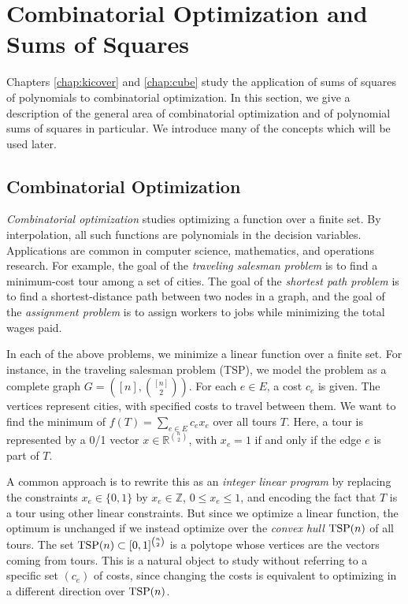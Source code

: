 \section{Combinatorial Optimization and Sums of Squares}
\label{section:cosos}
Chapters \ref{chap:kicover} and \ref{chap:cube} study the application of sums of squares of polynomials to combinatorial optimization. 
In this section, we give a description of the general area of combinatorial optimization and of polynomial sums of squares in particular.
We introduce many of the concepts which will be used later.

\subsection{Combinatorial Optimization}
\label{section:copt}
{\em Combinatorial optimization} studies optimizing a function over a finite set. 
By interpolation, all such functions are polynomials in the decision variables.
Applications are common in computer science, mathematics, and operations research.
For example, the goal of the {\em traveling salesman problem} is to find a minimum-cost tour among a set of cities.
The goal of the {\em shortest path problem} is to find a shortest-distance path between two nodes in a graph, and the goal of the {\em assignment problem} is to assign workers to jobs while minimizing the total wages paid. 

In each of the above problems, we minimize a linear function over a finite set.
For instance, in the traveling salesman problem (TSP), we model the problem as a complete graph $G=([n],{ {[n]} \choose 2})$.
For each $e \in E$, a cost $c_e$ is given.
The vertices represent cities, with specified costs to travel between them.
We want to find the minimum of $f(T) = \sum_{e \in E} c_ex_e$ over all tours $T$.
Here, a tour is represented by a 0/1 vector $x \in \mathbb{R}^{n \choose 2}$, with $x_e = 1$ if and only if the edge $e$ is part of $T$.

A common approach is to rewrite this as an {\em integer linear program} by replacing the constraints $x_e \in \{0,1\}$ by $x_e \in \mathbb{Z}$, $0 \le x_e \le 1$, and encoding the fact that $T$ is a tour using other linear constraints.
But since we optimize a linear function, the optimum is unchanged if we instead optimize over the {\em convex hull} $\textup{TSP}(n)$ of all tours.
The set $\textup{TSP}(n) \subset [0,1]^{n \choose 2}$ is a polytope whose vertices are the vectors coming from tours.
This is a natural object to study without referring to a specific set $(c_e)$ of costs, since changing the costs is equivalent to optimizing in a different direction over $\textup{TSP}(n)$. 

